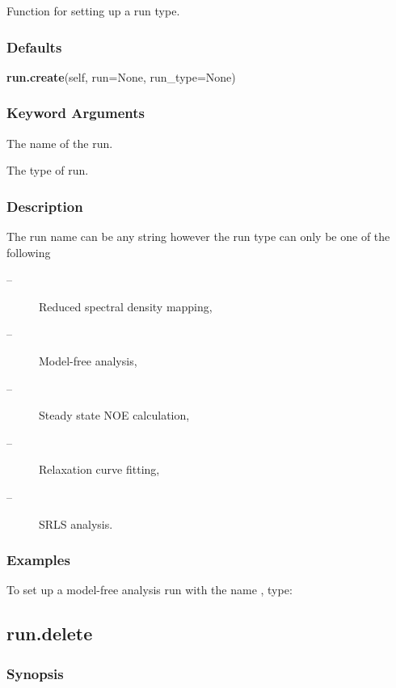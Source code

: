 Function for setting up a run type.

\subsubsection{Defaults}

\textsf{\textbf{run.create}(self, run=None, run\_type=None)}


\subsubsection{Keyword Arguments}


  The name of the run.

  The type of run.

\subsubsection{Description}

The run name can be any string however the run type can only be one of the following

\begin{description}
\item[    
 --]   Reduced spectral density mapping, 
\item[    
 --]   Model-free analysis,
\item[    
 --]   Steady state NOE calculation,
\item[    
 --]   Relaxation  curve fitting,
\item[    
 --]   SRLS analysis.
\end{description}


\subsubsection{Examples}

To set up a model-free analysis run with the name 
, type:




\newpage

\subsection{run.delete}


\subsubsection{Synopsis}


